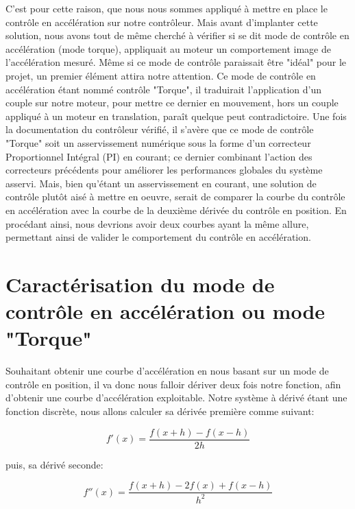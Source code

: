 \documentclass[french,a4paper,12pt]{report}
\begin{document}
	C'est pour cette raison, que nous nous sommes appliqué à mettre en place le contrôle en accélération sur notre contrôleur. Mais avant d'implanter cette solution, nous avons tout de même cherché à vérifier si se dit mode de contrôle en accélération (mode torque), appliquait au moteur un comportement image de l'accélération mesuré. Même si ce mode de contrôle paraissait être "idéal" pour le projet, un premier élément attira notre attention. Ce mode de contrôle en accélération étant nommé contrôle "Torque", il traduirait l'application d'un couple sur notre moteur, pour mettre ce dernier en mouvement, hors un couple appliqué à un moteur en translation, paraît quelque peut contradictoire.
	Une fois la documentation du contrôleur vérifié, il s'avère que ce mode de contrôle "Torque" soit un asservissement numérique sous la forme d'un correcteur Proportionnel Intégral (PI) en courant; ce dernier combinant l'action des correcteurs précédents pour améliorer les performances globales du système asservi. Mais, bien qu'étant un asservissement en courant, une solution de contrôle plutôt aisé à mettre en oeuvre, serait de comparer la courbe du contrôle en accélération avec la courbe de la deuxième dérivée du contrôle en position. En procédant ainsi, nous devrions avoir deux courbes ayant la même allure, permettant ainsi de valider le comportement du contrôle en accélération.
	
		\section{Caractérisation du mode de contrôle en accélération ou mode "Torque"}

	Souhaitant obtenir une courbe d'accélération en nous basant sur un mode de contrôle en position, il va donc nous falloir dériver deux fois notre fonction, afin d'obtenir une courbe d'accélération exploitable.
	Notre système à dérivé étant une fonction discrète, nous allons calculer sa dérivée première comme suivant: 
	
	\[	
		f'(x) = \frac{f(x+h) - f(x-h)}{2h}
	\]
	
	puis, sa dérivé seconde:
	
	\[	
		f''(x) = \frac{f(x+h) - 2f(x) + f(x-h)}{h^2}
	\]
	
\end{document}
